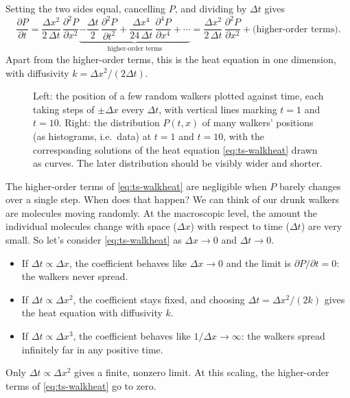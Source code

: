 Setting the two sides equal, cancelling $P$, and dividing by $\Delta t$ gives
\begin{equation}
  \frac{\partial P}{\partial t}
  = \frac{\Delta x^2}{2\,\Delta t}\,\frac{\partial^2 P}{\partial x^2}
  \underbrace{- \frac{\Delta t}{2}\,\frac{\partial^2 P}{\partial t^2}
  + \frac{\Delta x^4}{24\,\Delta t}\,\frac{\partial^4 P}{\partial x^4}
  + \cdots}_{\text{higher-order terms}} = \frac{\Delta x^2}{2\,\Delta t}\,\frac{\partial^2 P}{\partial x^2}
  + \text{(higher-order terms)}.
  \label{eq:ts-walkheat}
\end{equation}
Apart from the higher-order terms, this is the heat equation in one dimension, with diffusivity
$k = \Delta x^2 / (2\Delta t)$.

\begin{figure}[htbp]
  \centering
  \TSfigplaceholder{5cm}
  \caption{Left: the position of a few random walkers plotted against time, each taking steps of $\pm\Delta x$ every $\Delta t$, with vertical lines marking $t = 1$ and $t = 10$. Right: the distribution $P(t,x)$ of many walkers' positions (as histograms, i.e.\ data) at $t=1$ and $t=10$, with the corresponding solutions of the heat equation \eqref{eq:ts-walkheat} drawn as curves. The later distribution should be visibly wider and shorter.}
  \label{fig:ts-walk}
\end{figure}

The higher-order terms of \eqref{eq:ts-walkheat} are negligible when $P$ barely changes over a single step. When does that happen? We can think of our drunk walkers are molecules moving randomly. At the macroscopic level, the amount the individual molecules change with space ($\Delta x$) with respect to time ($\Delta t$) are very small. So
let's consider \eqref{eq:ts-walkheat} as $\Delta x \to 0$ and $\Delta t \to 0$.
\begin{itemize}
  \item If $\Delta t \propto \Delta x$, the coefficient behaves like $\Delta x \to 0$
        and the limit is $\partial P/\partial t = 0$: the walkers never spread.
  \item If $\Delta t \propto \Delta x^2$, the coefficient stays fixed, and choosing
        $\Delta t = \Delta x^2/(2k)$ gives the heat equation with diffusivity $k$.
  \item If $\Delta t \propto \Delta x^3$, the coefficient behaves like
        $1/\Delta x \to \infty$: the walkers spread infinitely far in any
        positive time.
\end{itemize}
Only $\Delta t \propto \Delta x^2$ gives a finite, nonzero limit. At this scaling, the higher-order terms of \eqref{eq:ts-walkheat} go to zero. 


